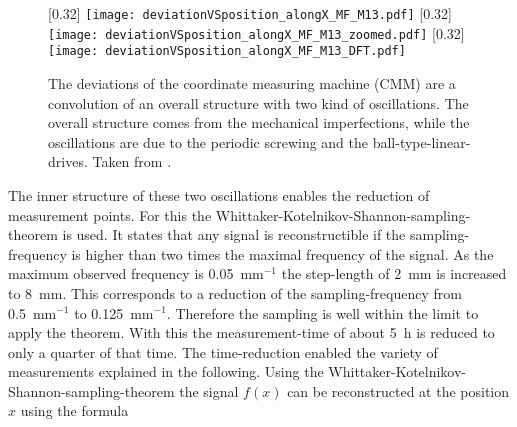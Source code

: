 \documentclass[
twoside,            %
BCOR1.4cm,          %
10pt,               %
headings=normal,    %
headsepline,        %
clearplainpage,		%
final,              %
div=14,
open=right,
bibliography=toc
]{scrreprt}
\begin{document}
\begin{figure}[!h]
	\centering
	[0.32\textwidth]
	{\texttt{[image: deviationVSposition\_alongX\_MF\_M13.pdf]}}
	\hfill
	[0.32\textwidth]
	{\texttt{[image: deviationVSposition\_alongX\_MF\_M13\_zoomed.pdf]}}
	\hfill
	[0.32\textwidth]
	{\texttt{[image: deviationVSposition\_alongX\_MF\_M13\_DFT.pdf]}}
	\vspace{-2mm}
	\caption{
		The deviations of the coordinate measuring machine (CMM) are a convolution of an overall structure with two kind of oscillations.
		The overall structure comes from the mechanical imperfections, while the oscillations are due to the periodic screwing and the ball-type-linear-drives.
		Taken from \cite{feilThesis}.
	}
	\label{deviationVSposition_alongX} 
\end{figure}

The inner structure of these two oscillations enables the reduction of measurement points.
For this the Whittaker-Kotelnikov-Shannon-sampling-theorem \cite{samplingKotelnikov} is used.
It states that any signal is reconstructible if the sampling-frequency is higher than two times the maximal frequency of the signal.
As the maximum observed frequency is \SI{0.05}{mm}$^{-1}$ the step-length of \SI{2}{mm} is increased to \SI{8}{mm}.
This corresponds to a reduction of the sampling-frequency from \SI{0.5}{mm}$^{-1}$ to \SI{0.125}{mm}$^{-1}$.
Therefore the sampling is well within the limit to apply the theorem.
With this the measurement-time of about \SI{5}{h} is reduced to only a quarter of that time.
The time-reduction enabled the variety of measurements explained in the following.
Using the Whittaker-Kotelnikov-Shannon-sampling-theorem the signal $f(x)$ can be reconstructed at the position $x$ using the formula
\end{document}
